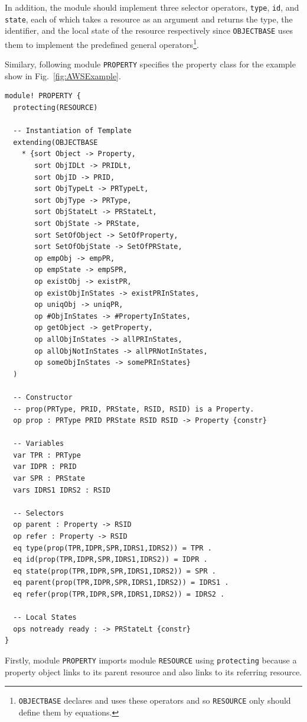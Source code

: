 \documentclass[12pt]{report}
\begin{document}
In addition, the module should implement three selector operators,
{\tt type}, {\tt id}, and {\tt state}, each of which takes a resource
as an argument and returns the type, the identifier, and the local
state of the resource respectively since {\tt OBJECTBASE} uses them to
implement the predefined general operators\footnote{{\tt OBJECTBASE}
  declares and uses these operators and so {\tt RESOURCE} only should
  define them by equations.}.

Similary, following module {\tt PROPERTY} specifies the property class 
for the example show in Fig.~\ref{fig:AWSExample}.
\begin{verbatim}
module! PROPERTY {
  protecting(RESOURCE)

  -- Instantiation of Template
  extending(OBJECTBASE
    * {sort Object -> Property,
       sort ObjIDLt -> PRIDLt,
       sort ObjID -> PRID,
       sort ObjTypeLt -> PRTypeLt,
       sort ObjType -> PRType,
       sort ObjStateLt -> PRStateLt,
       sort ObjState -> PRState,
       sort SetOfObject -> SetOfProperty,
       sort SetOfObjState -> SetOfPRState,
       op empObj -> empPR,
       op empState -> empSPR,
       op existObj -> existPR,
       op existObjInStates -> existPRInStates,
       op uniqObj -> uniqPR,
       op #ObjInStates -> #PropertyInStates,
       op getObject -> getProperty,
       op allObjInStates -> allPRInStates,
       op allObjNotInStates -> allPRNotInStates,
       op someObjInStates -> somePRInStates}
  )

  -- Constructor
  -- prop(PRType, PRID, PRState, RSID, RSID) is a Property.
  op prop : PRType PRID PRState RSID RSID -> Property {constr}

  -- Variables
  var TPR : PRType
  var IDPR : PRID
  var SPR : PRState
  vars IDRS1 IDRS2 : RSID

  -- Selectors
  op parent : Property -> RSID
  op refer : Property -> RSID
  eq type(prop(TPR,IDPR,SPR,IDRS1,IDRS2)) = TPR .
  eq id(prop(TPR,IDPR,SPR,IDRS1,IDRS2)) = IDPR .
  eq state(prop(TPR,IDPR,SPR,IDRS1,IDRS2)) = SPR .
  eq parent(prop(TPR,IDPR,SPR,IDRS1,IDRS2)) = IDRS1 .
  eq refer(prop(TPR,IDPR,SPR,IDRS1,IDRS2)) = IDRS2 .

  -- Local States
  ops notready ready : -> PRStateLt {constr}
}
\end{verbatim}
Firstly, module {\tt PROPERTY} imports module {\tt RESOURCE} using
{\tt protecting} because a property object links to its parent
resource and also links to its referring resource.
\end{document}
